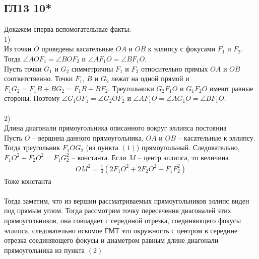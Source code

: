 \subsection*{ГЛ13 10*}
Докажем сперва вспомогательные факты:\\
1)\\
Из точки $O$ проведены касательные $OA$ и $OB$ к эллипсу с фокусами $F_1$ и $F_2$. Тогда $\angle AOF_1 = \angle BOF_2$ и $\angle AF_1O = \angle BF_1O$.\\
Пусть точки $G_1$ и $G_2$ симметричны $F_1$ и $F_2$ относительно прямых $OA$ и $OB$ соответственно. Точки $F_1$, $B$ и $G_2$ лежат на одной прямой и $F_1G_2 = F_1B + BG_2 = F_1B + BF_2$. Треугольники $G_2F_1O$ и $G_1F_2O$ имеют равные стороны. Поэтому $\angle G_1OF_1 = \angle  G_2OF_2$ и $\angle AF_1O = \angle AG_1O = \angle BF_1O$.\\
\\
2)\\
Длина диагонали прямоугольника описанного вокруг эллипса постоянна\\
Пусть $O$ -- вершина данного прямоугольника, $OA$ и $OB$ -- касательные к эллипсу. Тогда треугольник $F_1OG_2$ (из пункта $(1)$) прямоугольный. Следовательно, $F_1O^2 + F_2O^2 = F_1G_2^2$ -- константа. Если $M$ -- центр эллипса, то величина 
\begin{gather*}
	O M^{2}=\frac{1}{4}\left(2 F_{1} O^{2}+2 F_{2} O^{2}-F_{1} F_{2}^{2}\right)
\end{gather*}
Тоже константа\\
\\
Тогда заметим, что из вершин рассматриваемых прямоугольников эллипс виден под прямым углом. Тогда рассмотрим точку пересечения диагоналей этих прямоугольников, она совпадает с серединой отрезка, соединяющего фокусы эллипса, следовательно искомое ГМТ это окружность с центром в середине отрезка соединяющего фокусы и диаметром равным длине диагонали прямоугольника из пункта $(2)$
		